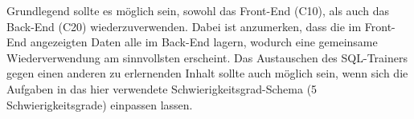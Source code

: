 Grundlegend sollte es möglich sein, sowohl das Front-End (C10), als auch das Back-End (C20) wiederzuverwenden. Dabei ist anzumerken, dass die im Front-End angezeigten Daten alle im Back-End lagern, wodurch eine gemeinsame Wiederverwendung am sinnvollsten erscheint. Das Austauschen des SQL-Trainers gegen einen anderen zu erlernenden Inhalt sollte auch möglich sein, wenn sich die Aufgaben in das hier verwendete Schwierigkeitsgrad-Schema (5 Schwierigkeitsgrade) einpassen lassen. 

%
